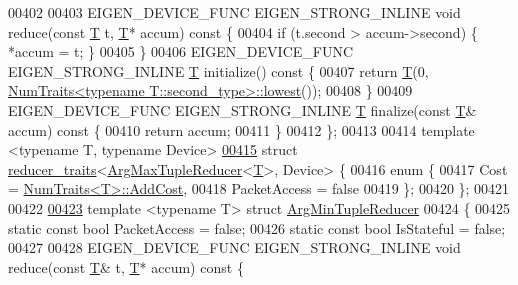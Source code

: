 \begin{DoxyCode}
00402 
00403   EIGEN\_DEVICE\_FUNC EIGEN\_STRONG\_INLINE \textcolor{keywordtype}{void} reduce(\textcolor{keyword}{const} \hyperlink{group___sparse_core___module}{T} t, \hyperlink{group___sparse_core___module}{T}* accum)\textcolor{keyword}{ const }\{
00404     \textcolor{keywordflow}{if} (t.second > accum->second) \{ *accum = t; \}
00405   \}
00406   EIGEN\_DEVICE\_FUNC EIGEN\_STRONG\_INLINE \hyperlink{group___sparse_core___module}{T} initialize()\textcolor{keyword}{ const }\{
00407     \textcolor{keywordflow}{return} \hyperlink{group___sparse_core___module}{T}(0, \hyperlink{group___core___module_struct_eigen_1_1_num_traits}{NumTraits<typename T::second\_type>::lowest}());
00408   \}
00409   EIGEN\_DEVICE\_FUNC EIGEN\_STRONG\_INLINE \hyperlink{group___sparse_core___module}{T} finalize(\textcolor{keyword}{const} \hyperlink{group___sparse_core___module}{T}& accum)\textcolor{keyword}{ const }\{
00410     \textcolor{keywordflow}{return} accum;
00411   \}
00412 \};
00413 
00414 \textcolor{keyword}{template} <\textcolor{keyword}{typename} T, \textcolor{keyword}{typename} Device>
\hyperlink{struct_eigen_1_1internal_1_1reducer__traits_3_01_arg_max_tuple_reducer_3_01_t_01_4_00_01_device_01_4}{00415} \textcolor{keyword}{struct }\hyperlink{struct_eigen_1_1internal_1_1reducer__traits}{reducer\_traits}<\hyperlink{struct_eigen_1_1internal_1_1_arg_max_tuple_reducer}{ArgMaxTupleReducer}<\hyperlink{group___sparse_core___module}{T}>, Device> \{
00416   \textcolor{keyword}{enum} \{
00417     Cost = \hyperlink{group___core___module_struct_eigen_1_1_num_traits}{NumTraits<T>::AddCost},
00418     PacketAccess = \textcolor{keyword}{false}
00419   \};
00420 \};
00421 
00422 
\hyperlink{struct_eigen_1_1internal_1_1_arg_min_tuple_reducer}{00423} \textcolor{keyword}{template} <\textcolor{keyword}{typename} T> \textcolor{keyword}{struct }\hyperlink{struct_eigen_1_1internal_1_1_arg_min_tuple_reducer}{ArgMinTupleReducer}
00424 \{
00425   \textcolor{keyword}{static} \textcolor{keyword}{const} \textcolor{keywordtype}{bool} PacketAccess = \textcolor{keyword}{false};
00426   \textcolor{keyword}{static} \textcolor{keyword}{const} \textcolor{keywordtype}{bool} IsStateful = \textcolor{keyword}{false};
00427 
00428   EIGEN\_DEVICE\_FUNC EIGEN\_STRONG\_INLINE \textcolor{keywordtype}{void} reduce(\textcolor{keyword}{const} \hyperlink{group___sparse_core___module}{T}& t, \hyperlink{group___sparse_core___module}{T}* accum)\textcolor{keyword}{ const }\{

\end{DoxyCode}
